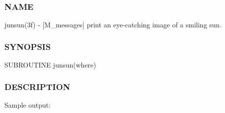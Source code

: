 \subsubsection*{N\+A\+ME}

junsun(3f) -\/ \mbox{[}M\+\_\+messages\mbox{]} print an eye-\/catching image of a smiling sun. 

\subsubsection*{S\+Y\+N\+O\+P\+S\+IS}

\begin{DoxyVerb}   SUBROUTINE junsun(where)
\end{DoxyVerb}


\subsubsection*{D\+E\+S\+C\+R\+I\+P\+T\+I\+ON}

Sample output\+:

\subparagraph*{}

\subparagraph*{}

\subparagraph*{}

\subparagraph*{}

\subparagraph*{}

\subparagraph*{}

\subparagraph*{}

\subparagraph*{}

\subsubsection*{}

\subparagraph*{}

\subparagraph*{}

\subparagraph*{}

\subparagraph*{}

\subparagraph*{}

\subparagraph*{}

\subparagraph*{}

\subparagraph*{}

\subparagraph*{}

\subparagraph*{}

\subsection*{}

\subparagraph*{}

